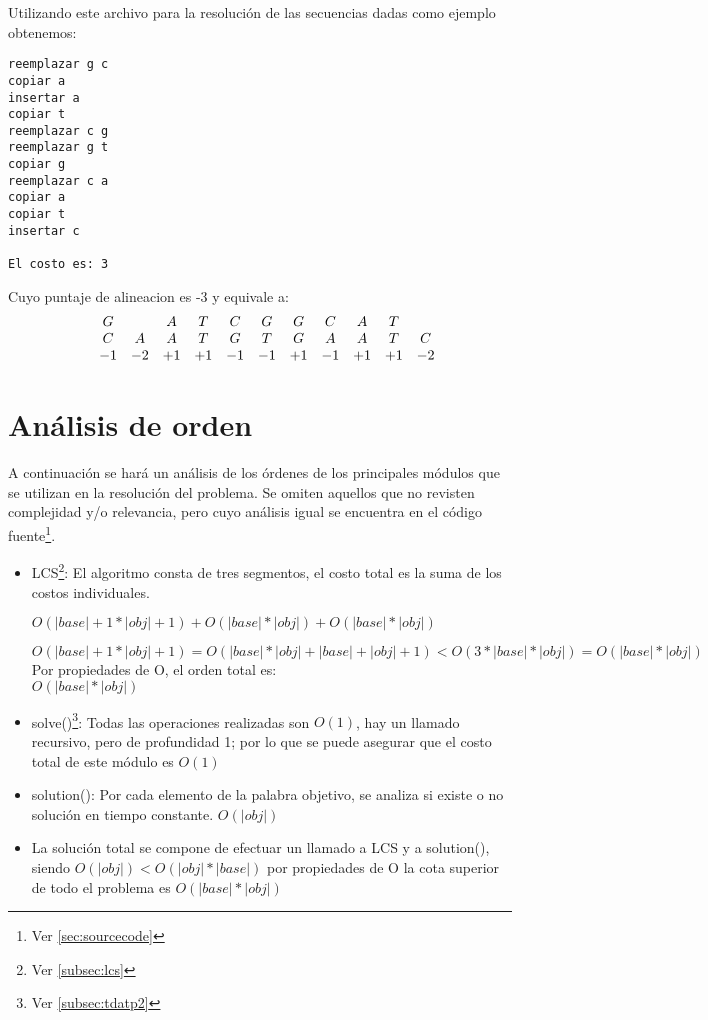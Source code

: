 \documentclass[12pt]{article}
\begin{document}
Utilizando este archivo para la resolución de las secuencias dadas como
ejemplo obtenemos:
\begin{lstlisting}
reemplazar g c
copiar a
insertar a
copiar t
reemplazar c g
reemplazar g t
copiar g
reemplazar c a
copiar a
copiar t
insertar c

El costo es: 3
\end{lstlisting}
Cuyo puntaje de alineacion es -3 y equivale a:
\[
\begin{array}{ccccccccccccc}
  &G &\space &A &T &C &G &G &C &A &T &\space  \\
  &C &A &A &T &G &T &G &A &A &T &C	\\
  &-1 &-2 &+1 &+1 &-1 &-1 &+1 &-1 &+1 &+1 &-2
\end{array}
\]

\newpage
\section{Análisis de orden}
A continuación se hará un análisis de los órdenes de los principales
módulos que se utilizan en la resolución del problema. Se omiten aquellos
que no revisten complejidad y/o relevancia, pero cuyo análisis igual se
encuentra en el código fuente\footnote{Ver \ref{sec:sourcecode}}.

\begin{itemize}
	\item LCS\footnote{Ver \ref{subsec:lcs}}: El algoritmo consta
	de tres segmentos, el costo total es la suma de los costos individuales.
	
	$O(|base|+1 * |obj|+1)+O(|base|*|obj|)+O(|base|*|obj|)$
	
	$O(|base|+1 * |obj|+1)=O(|base|*|obj|+|base|+|obj|+1)<O(3*|base|*|obj|)=O(|base|*|obj|)$
	\\Por propiedades de O, el orden total es:
	\\$O(|base|*|obj|)$
	
	\item solve()\footnote{\label{pie1}Ver \ref{subsec:tdatp2}}: Todas las operaciones realizadas son $O(1)$, hay un llamado
	recursivo, pero de profundidad 1; por lo que se puede asegurar que el 
	costo total de este módulo es $O(1)$
	
	\item solution(): Por cada elemento de la palabra objetivo, se analiza
	si existe o no solución en tiempo constante. $O(|obj|)$
	
	\item La solución total se compone de efectuar un llamado a LCS y a 
	solution(), siendo $O(|obj|)<O(|obj|*|base|)$ por propiedades de O
	la cota superior de todo el problema es $O(|base|*|obj|)$
\end{itemize}
\end{document}
